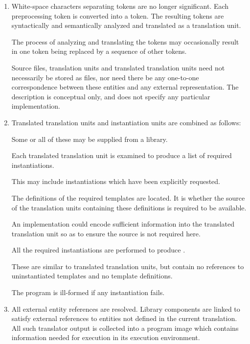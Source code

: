 \begin{enumerate}
\item White-space characters separating tokens are no longer
significant. Each preprocessing token is converted into a
token. The resulting tokens are syntactically and
semantically analyzed and translated as a translation unit. \begin{note}
The process of analyzing and translating the tokens may occasionally
result in one token being replaced by a sequence of other
tokens.\end{note} \begin{note} Source files, translation
units and translated translation units need not necessarily be stored as
files, nor need there be any one-to-one correspondence between these
entities and any external representation. The description is conceptual
only, and does not specify any particular implementation. \end{note}

\item Translated translation units and instantiation units are combined
as follows: \begin{note} Some or all of these may be supplied from a
library. \end{note} Each translated translation unit is examined to
produce a list of required instantiations. \begin{note} This may include
instantiations which have been explicitly
requested. \end{note} The definitions of the
required templates are located. It is  whether the
source of the translation units containing these definitions is required
to be available. \begin{note} An implementation could encode sufficient
information into the translated translation unit so as to ensure the
source is not required here. \end{note} All the required instantiations
are performed to produce
. \begin{note} These are similar
to translated translation units, but contain no references to
uninstantiated templates and no template definitions. \end{note} The
program is ill-formed if any instantiation fails.

\item All external entity references are resolved. Library
components are linked to satisfy external references to
entities not defined in the current translation. All such translator
output is collected into a program image which contains information
needed for execution in its execution environment.%
\end{enumerate}

